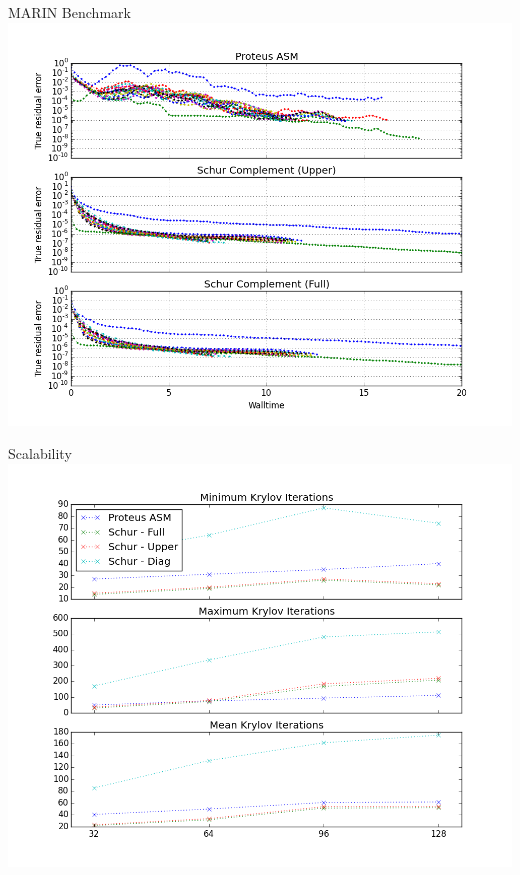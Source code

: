 \documentclass{beamer}
\begin{document}
\begin{frame}{MARIN Benchmark}
    \includegraphics[width=\textwidth]{figures/marin_comparison.png}
\end{frame}

\begin{frame}{Scalability}
    \includegraphics[width=\textwidth]{figures/marin_iterations_scalability.png}
\end{frame}
\end{document}
